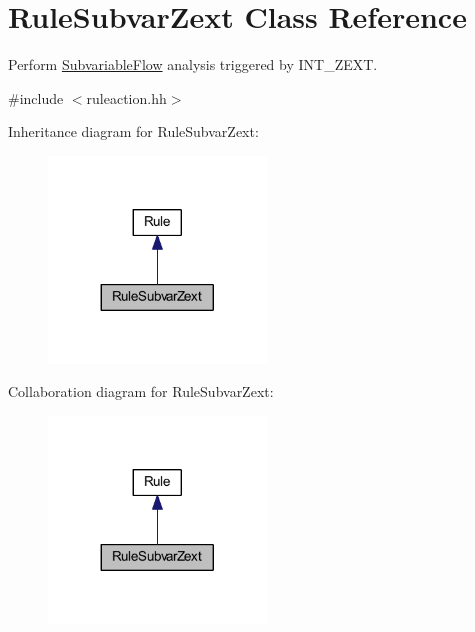\hypertarget{class_rule_subvar_zext}{}\section{Rule\+Subvar\+Zext Class Reference}
\label{class_rule_subvar_zext}


Perform \mbox{\hyperlink{class_subvariable_flow}{Subvariable\+Flow}} analysis triggered by I\+N\+T\+\_\+\+Z\+E\+XT.  




{\ttfamily \#include $<$ruleaction.\+hh$>$}



Inheritance diagram for Rule\+Subvar\+Zext\+:
\nopagebreak
\begin{figure}[H]
\begin{center}
\leavevmode
\includegraphics[width=164pt]{class_rule_subvar_zext__inherit__graph}
\end{center}
\end{figure}


Collaboration diagram for Rule\+Subvar\+Zext\+:
\nopagebreak
\begin{figure}[H]
\begin{center}
\leavevmode
\includegraphics[width=164pt]{class_rule_subvar_zext__coll__graph}
\end{center}
\end{figure}
